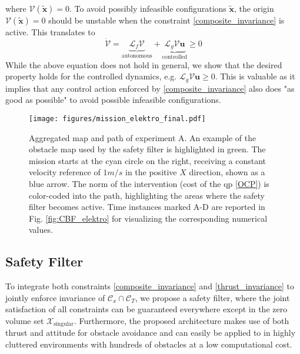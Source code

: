 where $\mathcal{V}(\tilde{\mathbf{x}}) = 0$. To avoid possibly infeasible configurations $\tilde{\mathbf{x}}$, the origin $\mathcal{V}(\tilde{\mathbf{x}}) = 0$ should be unstable when the constraint \eqref{composite_invariance} is active. This translates to
\begin{equation}
    \dot{\mathcal{V}} = \underbrace{\mathcal{L}_f \mathcal{V}}_{\text{autonomous}} + \underbrace{\mathcal{L}_g \mathcal{V} \mathbf{u}}_{\text{controlled}}  \geq 0
\end{equation}
While the above equation does not hold in general, we show that the desired property holds for the controlled dynamics, e.g. $\mathcal{L}_g \mathcal{V} \mathbf{u}  \geq 0$.
This is valuable as it implies that any control action enforced by \eqref{composite_invariance} also does "as good as possible" to avoid possible infeasible configurations.
\fi

\begin{figure*}[t]
    \centering
    \texttt{[image: figures/mission\_elektro\_final.pdf]}
    \caption{ \small Aggregated map and path of experiment A. An example of the obstacle map used by the safety filter is highlighted in green. The mission starts at the cyan circle on the right, receiving a constant velocity reference of $1 m/s$ in the positive $X$ direction, shown as a blue arrow. The norm of the intervention (cost of the \ac{qp} \eqref{OCP}) is color-coded into the path, highlighting the areas where the safety filter becomes active. Time instances marked A-D are reported in Fig. \ref{fig:CBF_elektro} for visualizing the corresponding numerical values.}
    \label{fig:mission_elektro}
    \vspace{-2ex}
\end{figure*}

\subsection{Safety Filter}
To integrate both constraints \eqref{composite_invariance} and \eqref{thrust_invariance} to jointly enforce invariance of $\mathcal{C}_x \cap \mathcal{C}_T $, we propose a safety filter, where the joint satisfaction of all constraints can be guaranteed everywhere except in the zero volume set $\mathcal{X}_\text{singular}$. Furthermore, the proposed architecture makes use of both thrust and attitude for obstacle avoidance and can easily be applied to in highly cluttered environments with hundreds of obstacles at a low computational cost.

